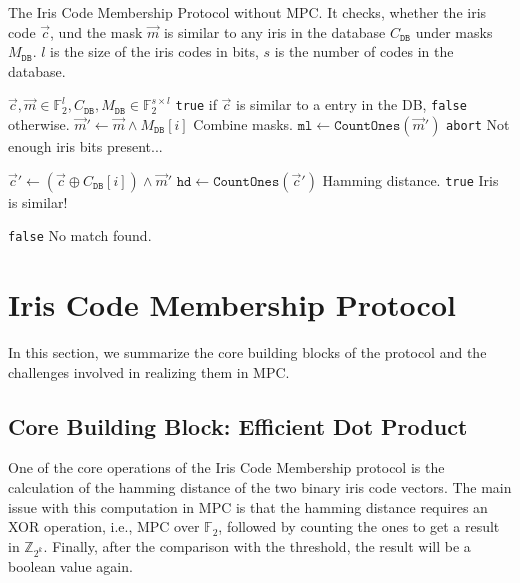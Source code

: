 \documentclass[a4paper,11pt,
]{article}
\newcommand{\F}{\ensuremath{\mathbb{F}}\xspace}
\newcommand{\Z}{\ensuremath{\mathbb{Z}}\xspace}
\begin{document}
\begin{algorithm}[ht]
    \caption{The Iris Code Membership Protocol without MPC. It checks, whether the iris code $\vec{c}$, und the mask $\vec{m}$ is similar to any iris in the database $C_\texttt{DB}$ under masks $M_\texttt{DB}$. $l$ is the size of the iris codes in bits, $s$ is the number of codes in the database. \label{alg:iris_plain}}
    \begin{algorithmic}[l]
        \Require $\vec{c}, \vec{m} \in \F_2^l, C_\texttt{DB}, M_\texttt{DB} \in \F_2^{s \times l}$
        \Ensure \texttt{true} if $\vec{c}$ is similar to a entry in the DB, \texttt{false} otherwise.
        \State $\vec{m}' \gets \vec{m} \wedge M_\texttt{DB}[i]$
        \Comment Combine masks.
        \State $\texttt{ml} \gets \texttt{CountOnes}(\vec{m}')$
        \State \Return \texttt{abort} \Comment Not enough iris bits present...
        \EndIf

        \State $\vec{c}' \gets (\vec{c} \oplus C_\texttt{DB}[i]) \wedge \vec{m}'$
        \State $\texttt{hd} \gets \texttt{CountOnes}(\vec{c}')$
        \Comment Hamming distance.
        \State \Return \texttt{true}
        \Comment Iris is similar!
        \EndIf
        \EndFor

        \State \Return \texttt{false}
        \Comment No match found.
    \end{algorithmic}
\end{algorithm}

\section{Iris Code Membership Protocol}

In this section, we summarize the core building blocks of the protocol and the challenges involved in realizing them in MPC.

\subsection{Core Building Block: Efficient Dot Product}

One of the core operations of the Iris Code Membership protocol is the calculation of the hamming distance of the two binary iris code vectors. The main issue with this computation in MPC is that the hamming distance requires an XOR operation, i.e., MPC over $\F_2$, followed by counting the ones to get a result in $\Z_{2^k}$. Finally, after the comparison with the threshold, the result will be a boolean value again.
\end{document}
